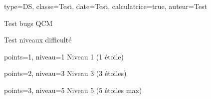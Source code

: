 \documentclass[correction=inline]{nfdevoirs}
\begin{document}
\begin{devoir}{
    type=DS,
    classe={Test},
    date={Test},
    calculatrice=true,
    auteur={Test}
}
\begin{partie}{Test bugs QCM}
\begin{exercice}{Test niveaux difficulté}
        \begin{question}{points=1, niveau=1}
            Niveau 1 (1 étoile)
        \end{question}

        \begin{question}{points=2, niveau=3}
            Niveau 3 (3 étoiles)
        \end{question}

        \begin{question}{points=3, niveau=5}
            Niveau 5 (5 étoiles max)
        \end{question}

    \end{exercice}

\end{partie}

\end{devoir}
\end{document}

